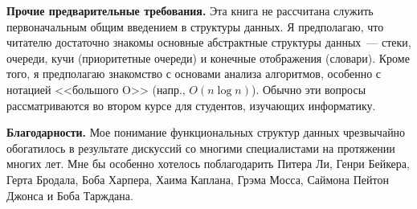 \textbf{Прочие предварительные требования.} Эта книга не рассчитана
служить первоначальным общим введением в структуры данных. Я
предполагаю, что читателю достаточно знакомы основные абстрактные
структуры данных~--- стеки, очереди, кучи (приоритетные очереди) и
конечные отображения (словари).  Кроме того, я предполагаю знакомство
с основами анализа алгоритмов, особенно с нотацией <<большого O>>
(напр., $O(n \log n)$). Обычно эти вопросы рассматриваются во втором
курсе для студентов, изучающих информатику.

\textbf{Благодарности.} Мое понимание функциональных структур данных
чрезвычайно обогатилось в результате дискуссий со многими
специалистами на протяжении многих лет.  Мне бы особенно хотелось
поблагодарить Питера Ли, Генри Бейкера, Герта Бродала, Боба Харпера,
Хаима Каплана, Грэма Мосса, Саймона Пейтон Джонса и Боба Тарждана.



